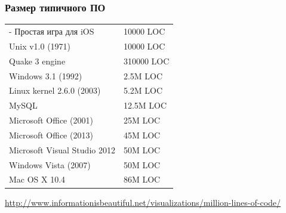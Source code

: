 \documentclass[xetex,mathserif,serif]{beamer}
\begin{document}
	\begin{frame}
		\frametitle{Размер типичного ПО}
		\begin{footnotesize}
			\begin{center}
				\begin{tabu} {| X[0.5 l p] | X[1 l p] |}
					\tabucline-
					\everyrow{\tabucline-}
					Простая игра для iOS            & 10000 LOC  \\
					Unix v1.0 (1971)                & 10000 LOC  \\
					Quake 3 engine                  & 310000 LOC \\
					Windows 3.1 (1992)              & 2.5M LOC   \\
					Linux kernel 2.6.0 (2003)       & 5.2M LOC   \\
					MySQL                           & 12.5M LOC  \\
					Microsoft Office (2001)         & 25M LOC    \\
					Microsoft Office (2013)         & 45M LOC    \\
					Microsoft Visual Studio 2012    & 50M LOC    \\
					Windows Vista (2007)            & 50M LOC    \\
					Mac OS X 10.4                   & 86M LOC    \\
				\end{tabu}
			\end{center}
			\url{http://www.informationisbeautiful.net/visualizations/million-lines-of-code/}
		\end{footnotesize}
	\end{frame}
\end{document}
